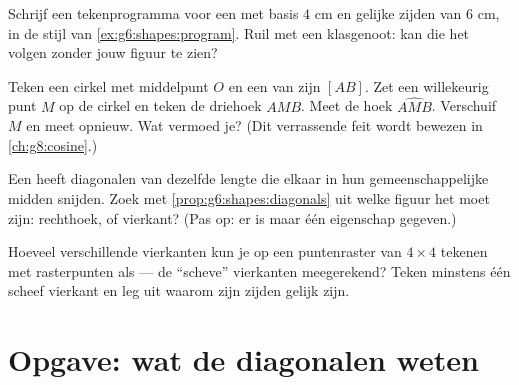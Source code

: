 \begin{exercise}[$\star\star$]\label{exo:g6:shapes:9}
Schrijf een tekenprogramma voor een  met basis $4$ cm en
gelijke zijden van $6$ cm, in de stijl van \cref{ex:g6:shapes:program}. Ruil met
een klasgenoot: kan die het volgen zonder jouw figuur te zien?
\end{exercise}

\begin{exercise}[$\star\star$]\label{exo:g6:shapes:10}
Teken een cirkel met middelpunt $O$ en een van zijn  $[AB]$. Zet een
willekeurig punt $M$ op de cirkel en teken de driehoek $AMB$. Meet de hoek
$\widehat{AMB}$. Verschuif $M$ en meet opnieuw. Wat vermoed je? (Dit
verrassende feit wordt bewezen in \cref{ch:g8:cosine}.)
\end{exercise}

\begin{exercise}[$\star\star$]\label{exo:g6:shapes:11}
Een  heeft diagonalen van dezelfde lengte die elkaar in hun
gemeenschappelijke midden snijden. Zoek met
\cref{prop:g6:shapes:diagonals} uit welke figuur het moet zijn: rechthoek,
 of vierkant? (Pas op: er is maar één eigenschap gegeven.)
\end{exercise}

\begin{exercise}[$\star\star\star$]\label{exo:g6:shapes:12}
Hoeveel verschillende vierkanten kun je op een puntenraster van $4 \times 4$
tekenen met rasterpunten als  --- de ``scheve'' vierkanten
meegerekend? Teken minstens één scheef vierkant en leg uit waarom zijn zijden
gelijk zijn.
\end{exercise}

\section{Opgave: wat de diagonalen weten}

